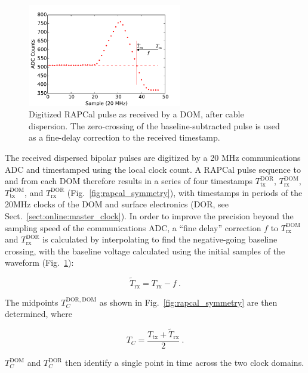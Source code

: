 \begin{figure}[h]
 \centering
 \includegraphics[width=0.6\textwidth]{graphics/dom/rapcal/dom_wf_zero_crossing.pdf}
 \caption{Digitized RAPCal pulse as received by a DOM, after cable dispersion.  The
   zero-crossing of the baseline-subtracted pulse is used as a fine-delay
   correction to the received timestamp.}
 \label{fig:rapcal_zero_crossing}
\end{figure}

The received dispersed bipolar pulses are digitized by a 20 MHz communications ADC and 
timestamped using the local clock count.  A RAPCal pulse sequence to and
from each DOM therefore results in a series of four timestamps 
$T_{\mathrm{tx}}^{\mathrm{DOR}}$, $T_{\mathrm{rx}}^{\mathrm{DOM}}$, 
$T_{\mathrm{tx}}^{\mathrm{DOM}}$,  and $T_{\mathrm{rx}}^{\mathrm{DOR}}$
(Fig.~\ref{fig:rapcal_symmetry}), with timestamps in periods
of the 20MHz clocks of the DOM and surface electronics (DOR, see
Sect.~\ref{sect:online:master_clock}).  In order to improve the precision
beyond the sampling speed of the communications ADC, a ``fine delay'' correction $f$ to
$T_{\mathrm{rx}}^{\mathrm{DOM}}$ and $T_{\mathrm{rx}}^{\mathrm{DOR}}$ is calculated by interpolating
to find the negative-going baseline crossing, with the baseline voltage
calculated using the initial samples of the waveform (Fig.~\ref{fig:rapcal_zero_crossing}):

\begin{equation}
  \tilde{T}_{\mathrm{rx}} = T_{\mathrm{rx}} - f\ .
\end{equation}


\noindent The midpoints $T_C^{\mathrm{DOR,DOM}}$ as shown in
Fig.~\ref{fig:rapcal_symmetry} are then determined, where

\begin{equation}
  T_C =  \frac{T_{\mathrm{tx}} + \tilde{T}_{\mathrm{rx}}}{2}\ .
\end{equation}

\noindent $T_C^{\mathrm{DOM}}$ and $T_C^{\mathrm{DOR}}$ then identify a
single point in time across the two clock domains.

